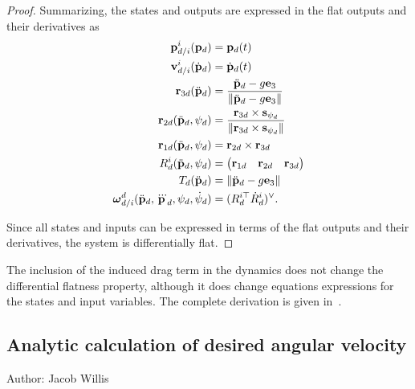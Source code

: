 \begin{proof}
Summarizing, the states and outputs are expressed in the flat outputs and their derivatives as
\begin{align*}
\mathbf{p}_{d/i}^i(\mathbf{p}_d) &= \mathbf{p}_d(t) \\
\mathbf{v}_{d/i}^i(\dot{\mathbf{p}}_d) &= \dot{\mathbf{p}}_d(t) \\
\mathbf{r}_{3d}(\ddot{\mathbf{p}}_d) &= \frac{\ddot{\mathbf{p}}_d - g \mathbf{e}_3}{\left\|\ddot{\mathbf{p}}_d - g \mathbf{e}_3\right\|} \\
\mathbf{r}_{2d}(\ddot{\mathbf{p}}_d, \psi_d) &= \frac{\mathbf{r}_{3d} \times \mathbf{s}_{\psi_d}}{\left\|\mathbf{r}_{3d} \times \mathbf{s}_{\psi_d}\right\|} \\
\mathbf{r}_{1d}(\ddot{\mathbf{p}}_d, \psi_d) &= \mathbf{r}_{2d} \times \mathbf{r}_{3d} \\
R_d^i(\ddot{\mathbf{p}}_d, \psi_d) &= \begin{pmatrix} \mathbf{r}_{1d} & \mathbf{r}_{2d} & \mathbf{r}_{3d} \end{pmatrix} \\
T_d(\ddot{\mathbf{p}}_d) &= \left\|\ddot{\mathbf{p}}_d - g \mathbf{e}_3\right\| \\	
\boldsymbol{\omega}_{d/i}^d(\ddot{\mathbf{p}}_d, \dddot{\mathbf{p}}_d, \psi_d, \dot{\psi}_d) &= (R_d^{i\top}\dot{R}_d^i)^\vee.
\end{align*}

Since all states and inputs can be expressed in terms of the flat outputs and their derivatives, the system is differentially flat.
\end{proof}

The inclusion of the induced drag term in the dynamics does not change the differential flatness property, although it does change equations expressions for the states and input variables.  The complete derivation is given in~\cite{FaesslerFranchiScaramuzza18.pdf}.


%




\subsection{Analytic calculation of desired angular velocity}
Author: Jacob Willis

